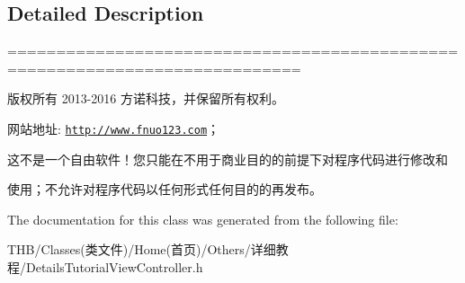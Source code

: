 \subsection{Detailed Description}
============================================================================

版权所有 2013-\/2016 方诺科技，并保留所有权利。

网站地址\+: \href{http://www.fnuo123.com}{\tt http\+://www.\+fnuo123.\+com}； 



这不是一个自由软件！您只能在不用于商业目的的前提下对程序代码进行修改和

使用；不允许对程序代码以任何形式任何目的的再发布。 

 

The documentation for this class was generated from the following file\+:\begin{DoxyCompactItemize}
\item 
T\+H\+B/\+Classes(类文件)/\+Home(首页)/\+Others/详细教程/Details\+Tutorial\+View\+Controller.\+h\end{DoxyCompactItemize}
